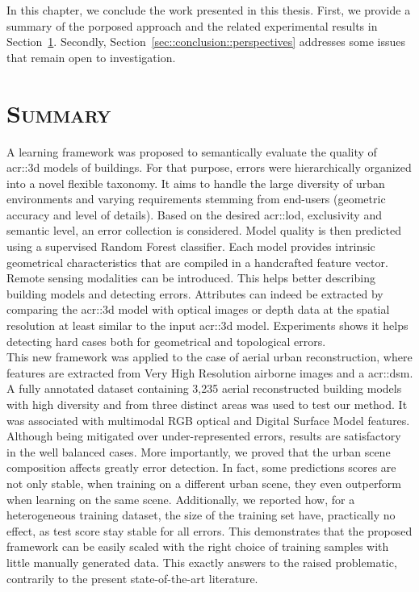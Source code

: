 \minitoc

\vfill

In this chapter, we conclude the work presented in this thesis.
First, we provide a summary of the porposed approach and the related experimental results in Section~\ref{sec::conclusion::summary}.
Secondly, Section~\ref{sec::conclusion::perspectives} addresses some issues that remain open to investigation.

\clearpage

\section{\textsc{Summary}}
    \label{sec::conclusion::summary}
    A learning framework was proposed to semantically evaluate the quality of \gls{acr::3d} models of buildings.
    For that purpose, errors were hierarchically organized into a novel flexible taxonomy.
    It aims to handle the large diversity of urban environments and varying requirements stemming from end-users (geometric accuracy and level of details).
    Based on the desired \gls{acr::lod}, exclusivity and semantic level, an error collection is considered.
    Model quality is then predicted using a supervised Random Forest classifier.
    Each model provides intrinsic geometrical characteristics that are compiled in a handcrafted feature vector.
    Remote sensing modalities can be introduced.
    This helps better describing building models and detecting errors.
    Attributes can indeed be extracted by comparing the \gls{acr::3d} model with optical images or depth data at the spatial resolution at least similar to the input \gls{acr::3d} model.
    Experiments shows it helps detecting hard cases both for geometrical and topological errors.\\

    This new framework was applied to the case of aerial urban reconstruction, where features are extracted from Very High Resolution airborne images and a \gls*{acr::dsm}.
    A fully annotated dataset containing 3,235 aerial reconstructed building models with high diversity and from three distinct areas was used to test our method.
    It was associated with multimodal RGB optical and Digital Surface Model features.
    Although being mitigated over under-represented errors, results are satisfactory in the well balanced cases.
    More importantly, we proved that the urban scene composition affects greatly error detection.
    In fact, some predictions scores are not only stable, when training on a different urban scene, they even outperform when learning on the same scene.
    Additionally, we reported how, for a heterogeneous training dataset, the size of the training set have, practically no effect, as test score stay stable for all errors.
    This demonstrates that the proposed framework can be easily scaled with the right choice of training samples with little manually generated data.
    This exactly answers to the raised problematic, contrarily to the present state-of-the-art literature.

